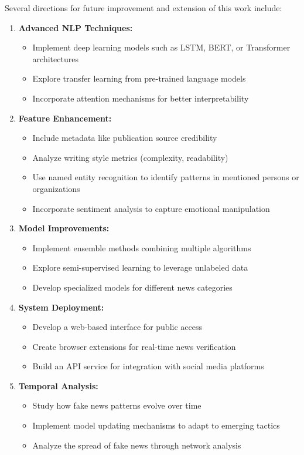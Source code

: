 \documentclass[12pt]{article}
\begin{document}
Several directions for future improvement and extension of this work include:

\begin{enumerate}
    \item \textbf{Advanced NLP Techniques:} 
    \begin{itemize}
        \item Implement deep learning models such as LSTM, BERT, or Transformer architectures
        \item Explore transfer learning from pre-trained language models
        \item Incorporate attention mechanisms for better interpretability
    \end{itemize}
    
    \item \textbf{Feature Enhancement:}
    \begin{itemize}
        \item Include metadata like publication source credibility
        \item Analyze writing style metrics (complexity, readability)
        \item Use named entity recognition to identify patterns in mentioned persons or organizations
        \item Incorporate sentiment analysis to capture emotional manipulation
    \end{itemize}
    
    \item \textbf{Model Improvements:}
    \begin{itemize}
        \item Implement ensemble methods combining multiple algorithms
        \item Explore semi-supervised learning to leverage unlabeled data
        \item Develop specialized models for different news categories
    \end{itemize}
    
    \item \textbf{System Deployment:}
    \begin{itemize}
        \item Develop a web-based interface for public access
        \item Create browser extensions for real-time news verification
        \item Build an API service for integration with social media platforms
    \end{itemize}
    
    \item \textbf{Temporal Analysis:}
    \begin{itemize}
        \item Study how fake news patterns evolve over time
        \item Implement model updating mechanisms to adapt to emerging tactics
        \item Analyze the spread of fake news through network analysis
    \end{itemize}
\end{enumerate}
\end{document}
